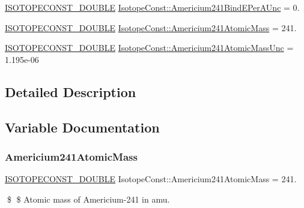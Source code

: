 \begin{DoxyCompactItemize}
\mbox{\hyperlink{group___isotope_const-_macros_ga8f45a7272ce02c0b4c65c44636ed719a}{I\+S\+O\+T\+O\+P\+E\+C\+O\+N\+S\+T\+\_\+\+D\+O\+U\+B\+LE}} \mbox{\hyperlink{group___isotope_const-_americium-_am241_gae6d9d03acd6d8b543e9eef81295445f9}{Isotope\+Const\+::\+Americium241\+Bind\+E\+Per\+A\+Unc}} = 0.
\item 
\mbox{\hyperlink{group___isotope_const-_macros_ga8f45a7272ce02c0b4c65c44636ed719a}{I\+S\+O\+T\+O\+P\+E\+C\+O\+N\+S\+T\+\_\+\+D\+O\+U\+B\+LE}} \mbox{\hyperlink{group___isotope_const-_americium-_am241_ga6dd1048f689cf6cd818dc844c10f9012}{Isotope\+Const\+::\+Americium241\+Atomic\+Mass}} = 241.
\item 
\mbox{\hyperlink{group___isotope_const-_macros_ga8f45a7272ce02c0b4c65c44636ed719a}{I\+S\+O\+T\+O\+P\+E\+C\+O\+N\+S\+T\+\_\+\+D\+O\+U\+B\+LE}} \mbox{\hyperlink{group___isotope_const-_americium-_am241_gae7c609ef217e0b6356bd98221021720e}{Isotope\+Const\+::\+Americium241\+Atomic\+Mass\+Unc}} = 1.\+195e-\/06
\end{DoxyCompactItemize}


\subsection{Detailed Description}


\subsection{Variable Documentation}
\mbox{\label{group___isotope_const-_americium-_am241_ga6dd1048f689cf6cd818dc844c10f9012}} 
\subsubsection{\texorpdfstring{Americium241\+Atomic\+Mass}{Americium241AtomicMass}}
{\footnotesize\ttfamily \mbox{\hyperlink{group___isotope_const-_macros_ga8f45a7272ce02c0b4c65c44636ed719a}{I\+S\+O\+T\+O\+P\+E\+C\+O\+N\+S\+T\+\_\+\+D\+O\+U\+B\+LE}} Isotope\+Const\+::\+Americium241\+Atomic\+Mass = 241.}

\$ \$ Atomic mass of Americium-\/241 in amu. \mbox{\label{group___isotope_const-_americium-_am241_gae7c609ef217e0b6356bd98221021720e}} 
